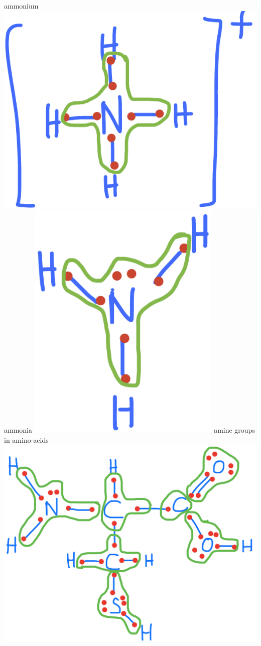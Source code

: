 \documentclass[]{book}
\theoremstyle{definition}
\theoremstyle{definition}
\theoremstyle{definition}
\theoremstyle{remark}
\begin{document}
ammonium~\includegraphics{pictures/ElecAlloc_NH4+.png} ammonia
\includegraphics[width=0.70000\textwidth]{pictures/ElecAlloc_NH3.png}
amine groups in amino-acids
\includegraphics{pictures/ElecAlloc_cysteine.png}
\end{document}
